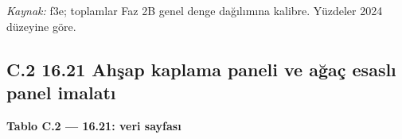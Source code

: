 \endgroup

\emph{Kaynak:} \etiketT{} f3e; toplamlar Faz 2B genel denge dağılımına kalibre. Yüzdeler 2024 düzeyine göre.

\hypertarget{nace_kartlar_16-18-c2-1621-ahux15fap-kaplama-paneli-ve-aux11fauxe7-esaslux131-panel-imalatux131}{%
\subsection{C.2 16.21 Ahşap kaplama paneli ve ağaç esaslı panel imalatı}\label{nace_kartlar_16-18-c2-1621-ahux15fap-kaplama-paneli-ve-aux11fauxe7-esaslux131-panel-imalatux131}}


\textbf{Tablo C.2 --- 16.21: veri sayfası}

\nopagebreak[4]

\begingroup\gbtablo\small

